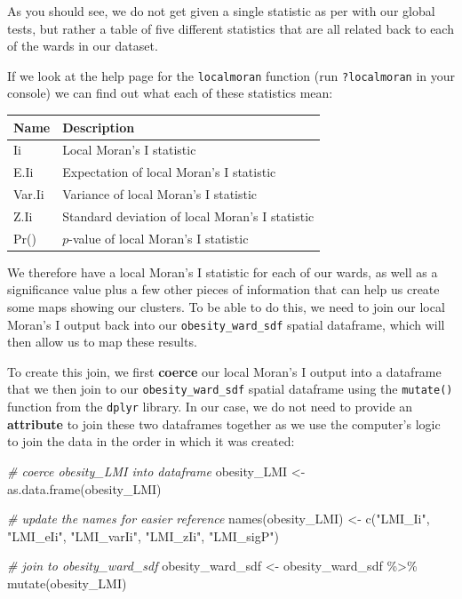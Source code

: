 \documentclass[
]{book}
\newenvironment{Shaded}{\begin{snugshade}}{\end{snugshade}}
\newcommand{\CommentTok}[1]{\textcolor[rgb]{0.56,0.35,0.01}{\textit{#1}}}
\newcommand{\FunctionTok}[1]{\textcolor[rgb]{0.00,0.00,0.00}{#1}}
\newcommand{\NormalTok}[1]{#1}
\newcommand{\OtherTok}[1]{\textcolor[rgb]{0.56,0.35,0.01}{#1}}
\newcommand{\SpecialCharTok}[1]{\textcolor[rgb]{0.00,0.00,0.00}{#1}}
\newcommand{\StringTok}[1]{\textcolor[rgb]{0.31,0.60,0.02}{#1}}
\begin{document}
As you should see, we do not get given a single statistic as per with our global tests, but rather a table of five different statistics that are all related back to each of the wards in our dataset.

If we look at the help page for the \texttt{localmoran} function (run \texttt{?localmoran} in your console) we can find out what each of these statistics mean:

\begin{longtable}[]{@{}ll@{}}
\toprule()
Name & Description \\
\midrule()
\endhead
Ii & Local Moran's I statistic \\
E.Ii & Expectation of local Moran's I statistic \\
Var.Ii & Variance of local Moran's I statistic \\
Z.Ii & Standard deviation of local Moran's I statistic \\
Pr() & \(p\)-value of local Moran's I statistic \\
\bottomrule()
\end{longtable}

We therefore have a local Moran's I statistic for each of our wards, as well as a significance value plus a few other pieces of information that can help us create some maps showing our clusters. To be able to do this, we need to join our local Moran's I output back into our \texttt{obesity\_ward\_sdf} spatial dataframe, which will then allow us to map these results.

To create this join, we first \textbf{coerce} our local Moran's I output into a dataframe that we then join to our \texttt{obesity\_ward\_sdf} spatial dataframe using the \texttt{mutate()} function from the \texttt{dplyr} library. In our case, we do not need to provide an \textbf{attribute} to join these two dataframes together as we use the computer's logic to join the data in the order in which it was created:

\begin{Shaded}
\begin{Highlighting}[]
\CommentTok{\# coerce obesity\_LMI into dataframe}
\NormalTok{obesity\_LMI }\OtherTok{\textless{}{-}} \FunctionTok{as.data.frame}\NormalTok{(obesity\_LMI)}

\CommentTok{\# update the names for easier reference}
\FunctionTok{names}\NormalTok{(obesity\_LMI) }\OtherTok{\textless{}{-}} \FunctionTok{c}\NormalTok{(}\StringTok{"LMI\_Ii"}\NormalTok{, }\StringTok{"LMI\_eIi"}\NormalTok{, }\StringTok{"LMI\_varIi"}\NormalTok{, }\StringTok{"LMI\_zIi"}\NormalTok{, }\StringTok{"LMI\_sigP"}\NormalTok{)}

\CommentTok{\# join to obesity\_ward\_sdf}
\NormalTok{obesity\_ward\_sdf }\OtherTok{\textless{}{-}}\NormalTok{ obesity\_ward\_sdf }\SpecialCharTok{\%\textgreater{}\%}
    \FunctionTok{mutate}\NormalTok{(obesity\_LMI)}
\end{Highlighting}
\end{Shaded}
\end{document}
